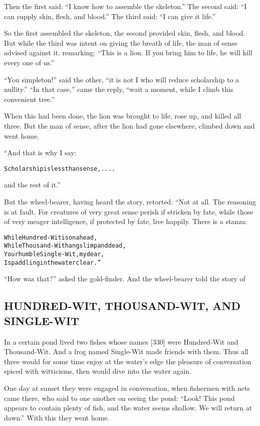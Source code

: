 \documentclass{article}
\renewenvironment{verbatim}{\begin{alltt}\normalfont\begin{centering}}{\end{centering}\end{alltt}}
\begin{document}
Then the first said: ``I know how to assemble the skeleton.'' The
second said: ``I can supply skin, flesh, and blood.'' The third
said: ``I can give it life.''

So the first assembled the skeleton, the second provided skin,
flesh, and blood. But while the third was intent on giving the
breath of life, the man of sense advised against it, remarking:
``This is a lion. If you bring him to life, he will kill every one of us.''

``You simpleton!'' said the other,
``it is not I who will reduce scholarship to a nullity.''
``In that case,'' came the reply,
``wait a moment, while I climb this convenient tree.''

When this had been done, the lion was brought to life, rose up, and
killed all three. But the man of sense, after the lion had gone
elsewhere, climbed down and went home.

“And that is why I say:

\begin{verbatim}
Scholarship is less than sense, ....
\end{verbatim}
and the rest of it.”

But the wheel-bearer, having heard the story, retorted: “Not at
all. The reasoning is at fault. For creatures of very great sense
perish if stricken by fate, while those of very meager
intelligence, if protected by fate, live happily. There is a
stanza:

\begin{verbatim}
While Hundred-Wit is on a head,
While Thousand-Wit hangs limp and dead,
Your humble Single-Wit, my dear,
Is paddling in the water clear.”
\end{verbatim}
``How was that?'' asked the gold-finder. And the wheel-bearer told
the story of

\subsection{HUNDRED-WIT, THOUSAND-WIT, AND SINGLE-WIT}

In a certain pond lived two fishes whose names [330] were
Hundred-Wit and Thousand-Wit. And a frog named Single-Wit made
friends with them. Thus all three would for some time enjoy at the
water's edge the pleasure of conversation spiced with witticisms,
then would dive into the water again.

One day at sunset they were engaged in conversation, when fishermen
with nets came there, who said to one another on seeing the pond:
``Look! This pond appears to contain plenty of fish, and the water seems shallow. We will return at dawn.''
With this they went home.
\end{document}
